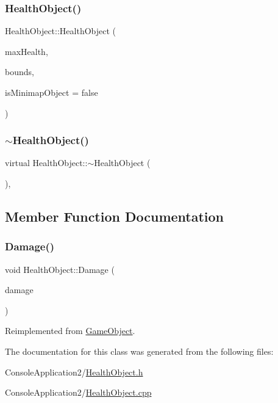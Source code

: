 \subsubsection{\texorpdfstring{Health\+Object()}{HealthObject()}}
{\footnotesize\ttfamily Health\+Object\+::\+Health\+Object (\begin{DoxyParamCaption}\item[{int}]{max\+Health,  }\item[{sf\+::\+Float\+Rect}]{bounds,  }\item[{bool}]{is\+Minimap\+Object = {\ttfamily false} }\end{DoxyParamCaption})}

\hypertarget{class_health_object_ac19c296f497bfca614d4742bafb4db9a}{}\label{class_health_object_ac19c296f497bfca614d4742bafb4db9a} 
\subsubsection{\texorpdfstring{$\sim$\+Health\+Object()}{~HealthObject()}}
{\footnotesize\ttfamily virtual Health\+Object\+::$\sim$\+Health\+Object (\begin{DoxyParamCaption}{ }\end{DoxyParamCaption})\hspace{0.3cm}{\ttfamily [inline]}, {\ttfamily [virtual]}}



\subsection{Member Function Documentation}
\hypertarget{class_health_object_a782acdc8ee8f50ce7e4a7b76b2b474be}{}\label{class_health_object_a782acdc8ee8f50ce7e4a7b76b2b474be} 
\subsubsection{\texorpdfstring{Damage()}{Damage()}}
{\footnotesize\ttfamily void Health\+Object\+::\+Damage (\begin{DoxyParamCaption}\item[{float}]{damage }\end{DoxyParamCaption})\hspace{0.3cm}{\ttfamily [virtual]}}



Reimplemented from \hyperlink{class_game_object_a1c5da37ca4c3e7d2bfa8970eb9b5202d}{Game\+Object}.



The documentation for this class was generated from the following files\+:\begin{DoxyCompactItemize}
\item 
Console\+Application2/\hyperlink{_health_object_8h}{Health\+Object.\+h}\item 
Console\+Application2/\hyperlink{_health_object_8cpp}{Health\+Object.\+cpp}\end{DoxyCompactItemize}
